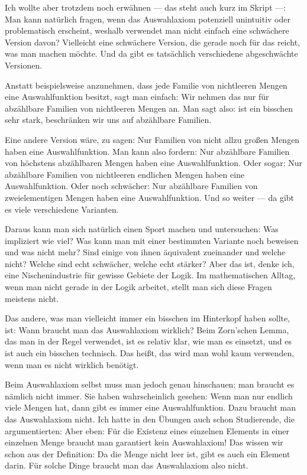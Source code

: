 \begin{spoken-clean}[00:05:57 - 00:10:07]
Ich wollte aber trotzdem noch erwähnen --- das steht auch kurz im Skript ---: Man kann natürlich fragen, wenn das Auswahlaxiom potenziell unintuitiv oder problematisch erscheint, weshalb verwendet man nicht einfach eine schwächere Version davon? Vielleicht eine schwächere Version, die gerade noch für das reicht, was man machen möchte. Und da gibt es tatsächlich verschiedene abgeschwächte Versionen.

Anstatt beispielsweise anzunehmen, dass jede Familie von nichtleeren Mengen eine Auswahlfunktion besitzt, sagt man einfach: Wir nehmen das nur für abzählbare Familien von nichtleeren Mengen an. Man sagt also:  ist ein bisschen sehr stark, beschränken wir uns auf abzählbare Familien.

Eine andere Version wäre, zu sagen: Nur Familien von nicht allzu großen Mengen haben eine Auswahlfunktion. Man kann also fordern: Nur abzählbare Familien von höchstens abzählbaren Mengen haben eine Auswahlfunktion. Oder sogar: Nur abzählbare Familien von nichtleeren endlichen Mengen haben eine Auswahlfunktion. Oder noch schwächer: Nur abzählbare Familien von zweielementigen Mengen haben eine Auswahlfunktion. Und so weiter --- da gibt es viele verschiedene Varianten.

Daraus kann man sich natürlich einen Sport machen und untersuchen: Was impliziert wie viel? Was kann man mit einer bestimmten Variante noch beweisen und was nicht mehr? Sind einige von ihnen äquivalent zueinander und welche nicht? Welche sind echt schwächer, welche echt stärker? Aber das ist, denke ich, eine Nischenindustrie für gewisse Gebiete der Logik. Im mathematischen Alltag, wenn man nicht gerade in der Logik arbeitet, stellt man sich diese Fragen meistens nicht.
\end{spoken-clean}

\begin{spoken-clean}[00:10:07 - 00:11:50]
Das andere, was man vielleicht immer ein bisschen im Hinterkopf haben sollte, ist: Wann braucht man das Auswahlaxiom wirklich? Beim Zorn'schen Lemma, das man in der Regel verwendet, ist es relativ klar, wie man es einsetzt, und es ist auch ein bisschen technisch. Das heißt, das wird man wohl kaum verwenden, wenn man es nicht wirklich benötigt.

Beim Auswahlaxiom selbst muss man jedoch genau hinschauen; man braucht es nämlich nicht immer. Sie haben wahrscheinlich gesehen: Wenn man nur endlich viele Mengen hat, dann gibt es immer eine Auswahlfunktion. Dazu braucht man das Auswahlaxiom nicht. Ich hatte in den Übungen auch schon Studierende, die argumentierten:  Aber eben: Für die Existenz eines einzelnen Elements in einer einzelnen Menge braucht man garantiert kein Auswahlaxiom! Das wissen wir schon aus der Definition: Da die Menge nicht leer ist, gibt es auch ein Element darin. Für solche Dinge braucht man das Auswahlaxiom also nicht.
\end{spoken-clean}

